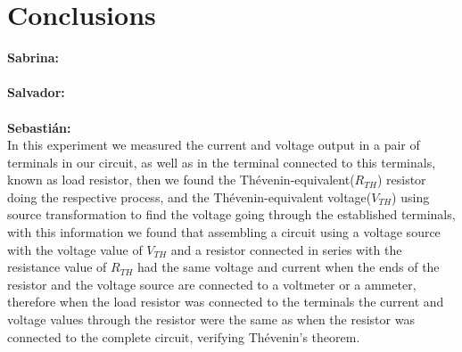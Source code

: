 \documentclass[letterpaper]{article}
\begin{document}
\section{Conclusions}
{\large\textbf{Sabrina:}}\\
%
\\[2ex]
{\large\textbf{Salvador:}}\\
%
\\[2ex]
{\large\textbf{Sebastián:}}\\
In this experiment we measured the current and voltage output in a pair of terminals in our
circuit, as well as in the terminal connected to this terminals, known as load resistor, then we found the Thévenin-equivalent($R_{TH}$) resistor doing the respective process, and the
Thévenin-equivalent voltage($V_{TH}$) using source transformation to find the voltage going through the
established terminals, with this information we found that assembling a circuit using a voltage
source with the voltage value of $V_{TH}$ and a resistor connected in series with the resistance
value of $R_{TH}$ had the same voltage and current when the ends of the resistor and the voltage
source are connected to a voltmeter or a ammeter, therefore when the load resistor was connected
to the terminals the current and voltage values through the resistor were the same as when the
resistor was connected to the complete circuit, verifying Thévenin's theorem.
\end{document}
